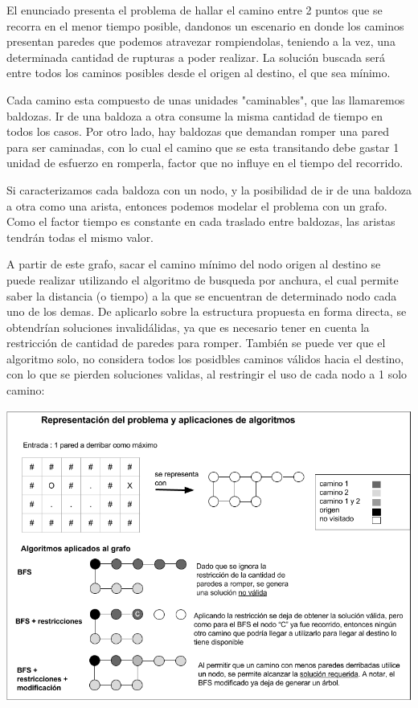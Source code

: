 El enunciado presenta el problema de hallar el camino entre 2 puntos que se recorra en el menor tiempo posible, dandonos un escenario en donde los caminos presentan paredes que podemos atravezar rompiendolas, teniendo a la vez, una determinada cantidad de rupturas a poder realizar. La solución buscada será entre todos los caminos posibles desde el origen al destino, el que sea mínimo.

Cada camino esta compuesto de unas unidades "caminables", que las llamaremos baldozas. Ir de una baldoza a otra consume la misma cantidad de tiempo en todos los casos. Por otro lado, hay 
baldozas que demandan romper una pared para ser caminadas, con lo cual el camino que se esta transitando debe gastar 1 unidad de esfuerzo en romperla, factor que no influye en el tiempo del recorrido.

Si caracterizamos cada baldoza con un nodo, y la posibilidad de ir de una baldoza a otra como una arista, entonces podemos modelar el problema con un grafo. Como el factor tiempo es constante en cada traslado entre baldozas, las aristas tendrán todas el mismo valor.

A partir de este grafo, sacar el camino mínimo del nodo origen al destino se puede realizar utilizando el algoritmo de busqueda por anchura, el cual permite saber la distancia (o tiempo) a la que se encuentran de determinado nodo cada uno de los demas. De aplicarlo sobre la estructura propuesta en forma directa, se obtendrían soluciones invalidálidas, ya que es necesario tener en cuenta la restricción de cantidad de paredes para romper. También se puede ver que el algoritmo solo, no considera todos los posidbles caminos válidos hacia el destino, con lo que se pierden soluciones validas, al restringir el uso de cada nodo a 1 solo camino:

  \vspace*{0.3cm} \vspace*{0.3cm}
  \begin{center}
 \includegraphics[scale=0.6]{./EJ1/ej1-explicacion.png}
  \end{center}
  \vspace*{0.3cm}

